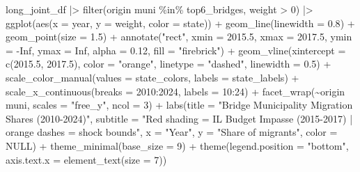 \documentclass[
  11pt,
  letterpaper,
  DIV=11,
  numbers=noendperiod]{scrartcl}
\newenvironment{Shaded}{}{}
\newcommand{\AttributeTok}[1]{\textcolor[rgb]{0.84,0.23,0.29}{#1}}
\newcommand{\ConstantTok}[1]{\textcolor[rgb]{0.00,0.36,0.77}{#1}}
\newcommand{\DecValTok}[1]{\textcolor[rgb]{0.00,0.36,0.77}{#1}}
\newcommand{\FloatTok}[1]{\textcolor[rgb]{0.00,0.36,0.77}{#1}}
\newcommand{\FunctionTok}[1]{\textcolor[rgb]{0.44,0.26,0.76}{#1}}
\newcommand{\NormalTok}[1]{\textcolor[rgb]{0.14,0.16,0.18}{#1}}
\newcommand{\SpecialCharTok}[1]{\textcolor[rgb]{0.00,0.36,0.77}{#1}}
\newcommand{\StringTok}[1]{\textcolor[rgb]{0.01,0.18,0.38}{#1}}
\begin{document}
\begin{Shaded}
\begin{Highlighting}[]
\NormalTok{long\_joint\_df }\SpecialCharTok{|\textgreater{}}
  \FunctionTok{filter}\NormalTok{(}\StringTok{\textasciigrave{}}\AttributeTok{origin muni}\StringTok{\textasciigrave{}} \SpecialCharTok{\%in\%}\NormalTok{ top6\_bridges, weight }\SpecialCharTok{\textgreater{}} \DecValTok{0}\NormalTok{) }\SpecialCharTok{|\textgreater{}}
  \FunctionTok{ggplot}\NormalTok{(}\FunctionTok{aes}\NormalTok{(}\AttributeTok{x =}\NormalTok{ year, }\AttributeTok{y =}\NormalTok{ weight, }\AttributeTok{color =}\NormalTok{ state)) }\SpecialCharTok{+}
  \FunctionTok{geom\_line}\NormalTok{(}\AttributeTok{linewidth =} \FloatTok{0.8}\NormalTok{) }\SpecialCharTok{+}
  \FunctionTok{geom\_point}\NormalTok{(}\AttributeTok{size =} \FloatTok{1.5}\NormalTok{) }\SpecialCharTok{+}
  \FunctionTok{annotate}\NormalTok{(}\StringTok{"rect"}\NormalTok{,}
           \AttributeTok{xmin =} \FloatTok{2015.5}\NormalTok{, }\AttributeTok{xmax =} \FloatTok{2017.5}\NormalTok{, }\AttributeTok{ymin =} \SpecialCharTok{{-}}\ConstantTok{Inf}\NormalTok{, }\AttributeTok{ymax =} \ConstantTok{Inf}\NormalTok{,}
           \AttributeTok{alpha =} \FloatTok{0.12}\NormalTok{, }\AttributeTok{fill =} \StringTok{"firebrick"}\NormalTok{) }\SpecialCharTok{+}
  \FunctionTok{geom\_vline}\NormalTok{(}\AttributeTok{xintercept =} \FunctionTok{c}\NormalTok{(}\FloatTok{2015.5}\NormalTok{, }\FloatTok{2017.5}\NormalTok{),}
             \AttributeTok{color =} \StringTok{"orange"}\NormalTok{, }\AttributeTok{linetype =} \StringTok{"dashed"}\NormalTok{, }\AttributeTok{linewidth =} \FloatTok{0.5}\NormalTok{) }\SpecialCharTok{+}
  \FunctionTok{scale\_color\_manual}\NormalTok{(}\AttributeTok{values =}\NormalTok{ state\_colors, }\AttributeTok{labels =}\NormalTok{ state\_labels) }\SpecialCharTok{+}
  \FunctionTok{scale\_x\_continuous}\NormalTok{(}\AttributeTok{breaks =} \DecValTok{2010}\SpecialCharTok{:}\DecValTok{2024}\NormalTok{, }\AttributeTok{labels =} \DecValTok{10}\SpecialCharTok{:}\DecValTok{24}\NormalTok{) }\SpecialCharTok{+}
  \FunctionTok{facet\_wrap}\NormalTok{(}\SpecialCharTok{\textasciitilde{}}\StringTok{\textasciigrave{}}\AttributeTok{origin muni}\StringTok{\textasciigrave{}}\NormalTok{, }\AttributeTok{scales =} \StringTok{"free\_y"}\NormalTok{, }\AttributeTok{ncol =} \DecValTok{3}\NormalTok{) }\SpecialCharTok{+}
  \FunctionTok{labs}\NormalTok{(}\AttributeTok{title    =} \StringTok{"Bridge Municipality Migration Shares (2010{-}2024)"}\NormalTok{,}
       \AttributeTok{subtitle =} \StringTok{"Red shading = IL Budget Impasse (2015{-}2017) | orange dashes = shock bounds"}\NormalTok{,}
       \AttributeTok{x =} \StringTok{"Year"}\NormalTok{, }\AttributeTok{y =} \StringTok{"Share of migrants"}\NormalTok{, }\AttributeTok{color =} \ConstantTok{NULL}\NormalTok{) }\SpecialCharTok{+}
  \FunctionTok{theme\_minimal}\NormalTok{(}\AttributeTok{base\_size =} \DecValTok{9}\NormalTok{) }\SpecialCharTok{+}
  \FunctionTok{theme}\NormalTok{(}\AttributeTok{legend.position =} \StringTok{"bottom"}\NormalTok{,}
        \AttributeTok{axis.text.x =} \FunctionTok{element\_text}\NormalTok{(}\AttributeTok{size =} \DecValTok{7}\NormalTok{))}
\end{Highlighting}
\end{Shaded}
\end{document}
